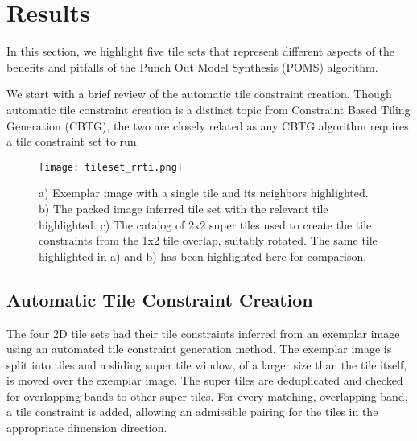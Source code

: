 \section{Results}

In this section, we highlight five tile sets that represent different aspects of the
benefits and pitfalls of the Punch Out Model Synthesis (POMS) algorithm.

We start with a brief review of the automatic tile constraint creation.
Though automatic tile constraint creation is a distinct topic from Constraint Based
Tiling Generation (CBTG), the two are closely related as any CBTG algorithm requires
a tile constraint set to run.

\begin{figure}[h]
  \texttt{[image: tileset\_rrti.png]}
  \caption{ a) Exemplar image with a single tile and its neighbors highlighted. b) The packed image inferred tile set with the relevant tile highlighted.
            c) The catalog of 2x2 super tiles used to create the tile constraints from the 1x2 tile overlap, suitably rotated. The same tile highlighted in a) and b) has been highlighted here for comparison. }
  \label{fig:rrti_tileset}
\end{figure}


\subsection{Automatic Tile Constraint Creation}

The four 2D tile sets had their tile constraints inferred from an exemplar image using
an automated tile constraint generation method.
The exemplar image is split into tiles and a sliding super tile window, of a larger size than the tile itself, is moved over the exemplar image.
The super tiles are deduplicated and checked for overlapping bands to other super tiles.
For every matching, overlapping band, a tile constraint is added, allowing an admissible pairing for the tiles in the
appropriate dimension direction.

